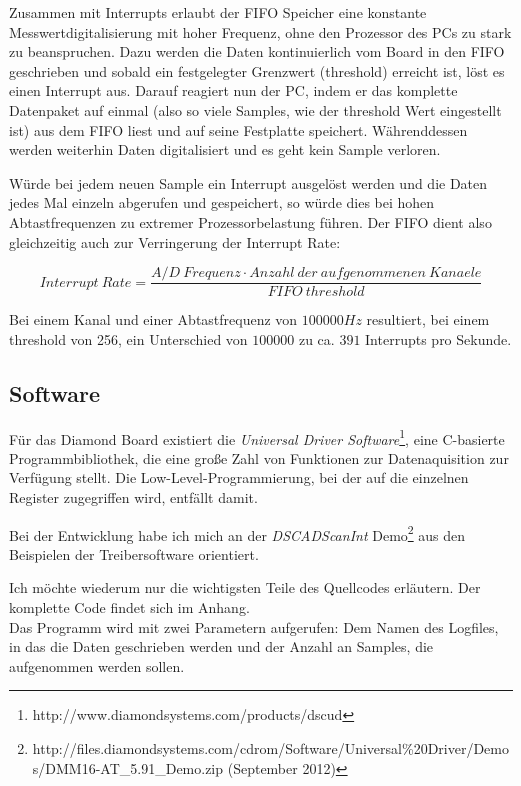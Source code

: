 \documentclass[12pt,a4paper]{scrartcl}
\begin{document}
Zusammen mit Interrupts erlaubt der FIFO Speicher eine konstante Messwertdigitalisierung mit hoher Frequenz, ohne den Prozessor des PCs zu stark zu beanspruchen. Dazu werden die Daten kontinuierlich vom Board in den FIFO geschrieben und sobald ein festgelegter Grenzwert (threshold) erreicht ist, löst es einen Interrupt aus. Darauf reagiert nun der PC, indem er das komplette Datenpaket auf einmal (also so viele Samples, wie der threshold Wert eingestellt ist) aus dem FIFO liest und auf seine Festplatte speichert. Währenddessen werden weiterhin Daten digitalisiert und es geht kein Sample verloren.

Würde bei jedem neuen Sample ein Interrupt ausgelöst werden und die Daten jedes Mal einzeln abgerufen und gespeichert, so würde dies bei hohen Abtastfrequenzen zu extremer Prozessorbelastung führen. Der FIFO dient also gleichzeitig auch zur Verringerung der Interrupt Rate:

\begin{equation}
Interrupt ~Rate = \frac{A/D ~Frequenz \cdot Anzahl ~der ~aufgenommenen ~Kanaele}{FIFO ~threshold}
\end{equation}

Bei einem Kanal und einer Abtastfrequenz von $100000 Hz$ resultiert, bei einem threshold von 256, ein Unterschied von $100000$ zu ca. $391$ Interrupts pro Sekunde.


\subsection{Software}

Für das Diamond Board existiert die \textit{Universal Driver Software}\footnote{http://www.diamondsystems.com/products/dscud}, eine C-basierte Programmbibliothek, die eine große Zahl von Funktionen zur Datenaquisition zur Verfügung stellt. Die Low-Level-Programmierung, bei der auf die einzelnen Register zugegriffen wird, entfällt damit. 

Bei der Entwicklung habe ich mich an der \textit{DSCADScanInt} Demo\footnote{http://files.diamondsystems.com/cdrom/Software/Universal\%20Driver/Demos/DMM16-AT\_5.91\_Demo.zip (September 2012)} aus den Beispielen der Treibersoftware orientiert.

Ich möchte wiederum nur die wichtigsten Teile des Quellcodes erläutern. Der komplette Code findet sich im Anhang. \\

Das Programm wird mit zwei Parametern aufgerufen: Dem Namen des Logfiles, in das die Daten geschrieben werden und der Anzahl an Samples, die aufgenommen werden sollen. 
\end{document}
